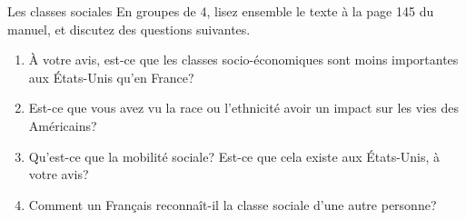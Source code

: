 \begin{frame}{Les classes sociales}
  En groupes de 4, lisez ensemble le texte à la page 145 du manuel, et discutez des questions suivantes.
  \begin{enumerate}
    \item À votre avis, est-ce que les classes socio-économiques sont moins importantes aux États-Unis qu'en France?
    \item Est-ce que vous avez vu la race ou l'ethnicité avoir un impact sur les vies des Américains?
    \item Qu'est-ce que la mobilité sociale? Est-ce que cela existe aux États-Unis, à votre avis?
    \item Comment un Français reconnaît-il la classe sociale d'une autre personne?
  \end{enumerate}
\end{frame}